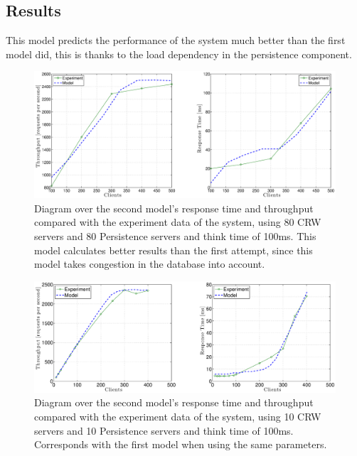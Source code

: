 \documentclass[a4paper, 11pt]{article}
\begin{document}
\subsection{Results}
	This model predicts the performance of the system much better than the first model did, this is thanks to the load dependency in the persistence component.
	\FloatBarrier
	\begin{figure}[ch!]
		\centering
			\includegraphics[width=1\linewidth,keepaspectratio]{secondRealAndModel}
		\caption{Diagram over the second model's response time and throughput compared with the experiment data of the system, using 80 CRW servers and 80 Persistence servers and think time of 100ms. This model calculates better results than the first attempt, since this model takes congestion in the database into account.}
		\label{fig:secondmodelResults}
	\end{figure}
	\FloatBarrier 
	\begin{figure}[ch!]
		\centering
			\includegraphics[width=1\linewidth,keepaspectratio]{secondRealAndModel10Threads}
		\caption{Diagram over the second model's response time and throughput compared with the experiment data of the system, using 10 CRW servers and 10 Persistence servers and think time of 100ms. Corresponds with the first model when using the same parameters.}
		\label{fig:secondmodelResults-10-th}
	\end{figure}
	\FloatBarrier
\end{document}
